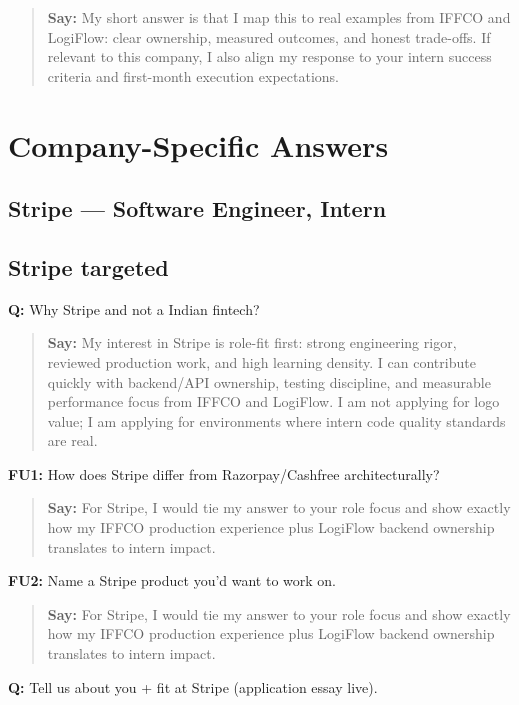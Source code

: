 \documentclass[9pt,a4paper]{article}
\begin{document}
\begin{quote}\small\textbf{Say:} My short answer is that I map this to real examples from IFFCO and LogiFlow: clear ownership, measured outcomes, and honest trade-offs. If relevant to this company, I also align my response to your intern success criteria and first-month execution expectations.\end{quote}
\vspace{2mm}
\newpage\section{Company-Specific Answers}
\subsection{Stripe --- Software Engineer, Intern}
\subsection{Stripe targeted}
\textbf{Q:} Why Stripe and not a Indian fintech?

\begin{quote}\small\textbf{Say:} My interest in Stripe is role-fit first: strong engineering rigor, reviewed production work, and high learning density. I can contribute quickly with backend/API ownership, testing discipline, and measurable performance focus from IFFCO and LogiFlow. I am not applying for logo value; I am applying for environments where intern code quality standards are real.\end{quote}
\vspace{2mm}
\textbf{FU1:} How does Stripe differ from Razorpay/Cashfree architecturally?

\begin{quote}\small\textbf{Say:} For Stripe, I would tie my answer to your role focus and show exactly how my IFFCO production experience plus LogiFlow backend ownership translates to intern impact.\end{quote}
\vspace{2mm}
\textbf{FU2:} Name a Stripe product you'd want to work on.

\begin{quote}\small\textbf{Say:} For Stripe, I would tie my answer to your role focus and show exactly how my IFFCO production experience plus LogiFlow backend ownership translates to intern impact.\end{quote}
\vspace{2mm}
\textbf{Q:} Tell us about you + fit at Stripe (application essay live).
\end{document}
